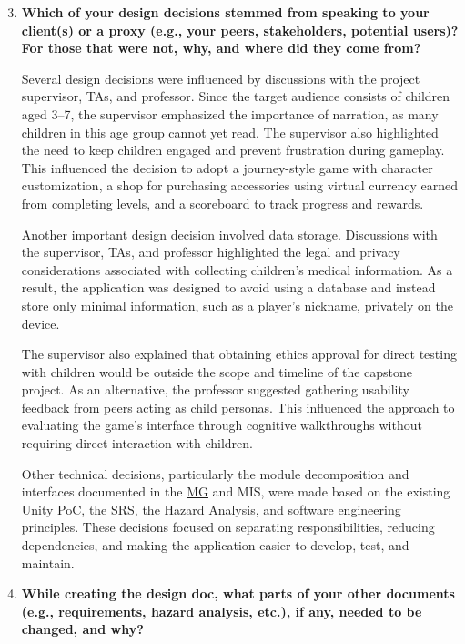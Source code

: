 \documentclass[10pt, titlepage]{article}
\newcommand{\mgurl}{https://github.com/team-hindsight/ophthamology-game/blob/main/pdfs/Design/SoftArchitecture/MG.pdf}
\newcommand{\mg}{\href{\mgurl}{MG}}
\begin{document}
\begin{enumerate}
    \setcounter{enumi}{2}

    \item \textbf{Which of your design decisions stemmed from speaking to your
    client(s) or a proxy (e.g., your peers, stakeholders, potential users)?
    For those that were not, why, and where did they come from?}

    Several design decisions were influenced by discussions
    with the project supervisor, TAs, and professor. Since the
    target audience consists of children aged 3--7, the
    supervisor emphasized the importance of narration, as
    many children in this age group cannot yet read. The
    supervisor also highlighted the need to keep children
    engaged and prevent frustration during gameplay. This
    influenced the decision to adopt a journey-style game
    with character customization, a shop for purchasing
    accessories using virtual currency earned from completing
    levels, and a scoreboard to track progress and rewards.

    Another important design decision involved data storage.
    Discussions with the supervisor, TAs, and professor
    highlighted the legal and privacy considerations associated
    with collecting children's medical information. As a
    result, the application was designed to avoid using a
    database and instead store only minimal information,
    such as a player's nickname, privately on the device.

    The supervisor also explained that obtaining ethics
    approval for direct testing with children would be
    outside the scope and timeline of the capstone project.
    As an alternative, the professor suggested gathering
    usability feedback from peers acting as child personas.
    This influenced the approach to evaluating the game's
    interface through cognitive walkthroughs without
    requiring direct interaction with children.

    Other technical decisions, particularly the module
    decomposition and interfaces documented in the \mg{} and MIS,
    were made based on the existing Unity PoC, the SRS,
    the Hazard Analysis, and software engineering principles.
    These decisions focused on separating responsibilities,
    reducing dependencies, and making the application easier
    to develop, test, and maintain.


    \item \textbf{While creating the design doc, what parts of your other
    documents (e.g., requirements, hazard analysis, etc.), if any, needed to
    be changed, and why?}


\end{enumerate}
\end{document}
